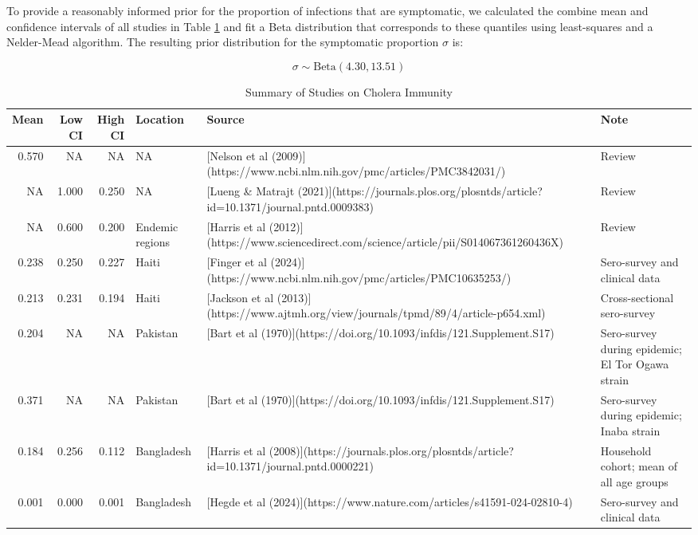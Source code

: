\documentclass[
]{book}
\begin{document}
To provide a reasonably informed prior for the proportion of infections that are symptomatic, we calculated the combine mean and confidence intervals of all studies in Table \ref{tab:symptomatic-table} and fit a Beta distribution that corresponds to these quantiles using least-squares and a Nelder-Mead algorithm. The resulting prior distribution for the symptomatic proportion \(\sigma\) is:

\begin{equation}
\sigma \sim \text{Beta}(4.30, 13.51)
\end{equation}

\begin{table}

\caption{\label{tab:symptomatic-table}Summary of Studies on Cholera Immunity}
\centering
\begin{tabular}[t]{r|r|r|l|l|l}
\hline
Mean & Low CI & High CI & Location & Source & Note\\
\hline
0.570 & NA & NA & NA & [Nelson et al (2009)](https://www.ncbi.nlm.nih.gov/pmc/articles/PMC3842031/) & Review\\
\hline
NA & 1.000 & 0.250 & NA & [Lueng \& Matrajt (2021)](https://journals.plos.org/plosntds/article?id=10.1371/journal.pntd.0009383) & Review\\
\hline
NA & 0.600 & 0.200 & Endemic regions & [Harris et al (2012)](https://www.sciencedirect.com/science/article/pii/S014067361260436X) & Review\\
\hline
0.238 & 0.250 & 0.227 & Haiti & [Finger et al (2024)](https://www.ncbi.nlm.nih.gov/pmc/articles/PMC10635253/) & Sero-survey and clinical data\\
\hline
0.213 & 0.231 & 0.194 & Haiti & [Jackson et al (2013)](https://www.ajtmh.org/view/journals/tpmd/89/4/article-p654.xml) & Cross-sectional sero-survey\\
\hline
0.204 & NA & NA & Pakistan & [Bart et al (1970)](https://doi.org/10.1093/infdis/121.Supplement.S17) & Sero-survey during epidemic; El Tor Ogawa strain\\
\hline
0.371 & NA & NA & Pakistan & [Bart et al (1970)](https://doi.org/10.1093/infdis/121.Supplement.S17) & Sero-survey during epidemic; Inaba strain\\
\hline
0.184 & 0.256 & 0.112 & Bangladesh & [Harris et al (2008)](https://journals.plos.org/plosntds/article?id=10.1371/journal.pntd.0000221) & Household cohort; mean of all age groups\\
\hline
0.001 & 0.000 & 0.001 & Bangladesh & [Hegde et al (2024)](https://www.nature.com/articles/s41591-024-02810-4) & Sero-survey and clinical data\\
\hline
\end{tabular}
\end{table}
\end{document}
